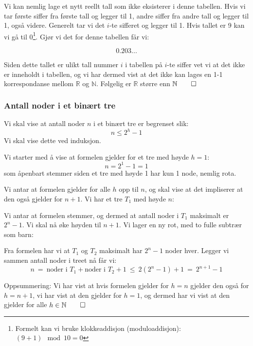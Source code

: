 Vi kan nemlig lage et nytt reellt tall som ikke eksisterer i denne tabellen. Hvis vi tar første siffer fra første tall og legger til 1, andre siffer fra andre tall og legger til 1, også videre. Generelt tar vi det $ i $-te sifferet og legger til 1. Hvis tallet er 9 kan vi gå til 0\footnote{Formelt kan vi bruke klokkeaddisjon (moduloaddisjon): $ (9 + 1) \mod{10}  = 0 $}. Gjør vi det for denne tabellen får vi:

\[ 0.203...  \]

Siden dette tallet er ulikt tall nummer $ i $ i tabellen på $ i $-te siffer vet vi at det ikke er inneholdt i tabellen, og vi har dermed vist at det ikke kan lages en 1-1 korrespondanse mellom $ \mathbb{R} $ og $ \mathbb{N} $. Følgelig er $ \mathbb{R} $ større enn $ \mathbb{N} \hfill\qed$ 

\subsubsection{Antall noder i et binært tre}
Vi skal vise at antall noder $ n $ i et binært tre er begrenset slik:
\begin{equation*}
n \leq 2^{h} - 1
\end{equation*}
Vi skal vise dette ved induksjon.

Vi starter med å vise at formelen gjelder for et tre med høyde $ h=1 $:
\[ n = 2^1 - 1 = 1 \]
som åpenbart stemmer siden et tre med høyde 1 har kun 1 node, nemlig rota.

Vi antar at formelen gjelder for alle $ h $ opp til $ n $, og skal vise at det impliserer at den også gjelder for $ n+1 $. Vi har et tre $ T_1 $ med høyde $ n $:
\begin{center}
\end{center}
Vi antar at formelen stemmer, og dermed at antall noder i $ T_1 $ maksimalt er $ 2^n - 1 $. Vi skal nå øke høyden til $ n+1 $. Vi lager en ny rot, med to fulle subtrær som barn:
\begin{center}
\end{center}
Fra formelen har vi at $ T_1 $ og $ T_2 $ maksimalt har $ 2^n-1 $ noder hver. Legger vi sammen antall noder i treet nå får vi:
\[ n ~=~ \text{noder i } T_1 + \text{noder i } T_2 + 1 ~\leq~ 2(2^n -1) + 1 ~=~ 2^{n+1} - 1 \]

Oppsummering: Vi har vist at hvis formelen gjelder for $ h=n $ gjelder den også for $ h=n+1 $, vi har vist at den gjelder for $ h=1 $, og dermed har vi vist at den gjelder for alle $ h \in \mathbb{N} \hfill\qed$